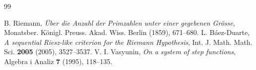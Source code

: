 \documentclass[11pt,a4paper]{article}
\theoremstyle{definition}
\begin{document}
\begin{thebibliography}{99}

 B. Riemann, \emph{\"Uber die Anzahl der Primzahlen unter einer gegebenen Gr\"osse}, Monatsber. K\"onigl. Preuss. Akad. Wiss. Berlin (1859), 671--680.
 L. B\'aez-Duarte, \emph{A sequential Riesz-like criterion for the Riemann Hypothesis}, Int. J. Math. Math. Sci. \textbf{2005} (2005), 3527--3537.
 V. I. Vasyunin, \emph{On a system of step functions}, Algebra i Analiz \textbf{7} (1995), 118--135.

\end{thebibliography}
\end{document}
